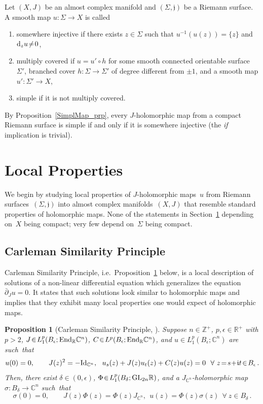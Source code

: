 \documentclass[11pt]{article}
\numberwithin{equation}{section}
\newtheorem{prp}[thm]{Proposition}
\theoremstyle{definition}
\def\BE#1{\begin{equation}\label{#1}}
\def\EE{\end{equation}}
\def\sf#1{\textsf{#1}}
\def\lra{\longrightarrow}
\def\C{\mathbb{C}}
\def\fI{\mathfrak i}
\def\fj{\mathfrak j}
\def\R{\mathbb R}
\def\Z{{\mathbb Z}}
\def\de{\delta}
\def\ep{\epsilon}
\def\si{\sigma}
\def\Si{\Sigma}
\def\dbar{\bar\partial}
\def\bu{\bullet}
\def\End{\textnormal{End}}
\def\GL{\textnormal{GL}}
\def\Id{\textnormal{Id}}
\def\nd{\textnormal{d}}
\begin{document}
\noindent
Let $(X,J)$ be an almost complex manifold and $(\Si,\fj)$ be a Riemann surface.
A smooth map \hbox{$u\!:\Si\!\lra\!X$} is called
\begin{enumerate}[label=$\bu$,leftmargin=*]

\item \sf{somewhere injective} if there exists $z\!\in\!\Si$
such that $u^{-1}(u(z))\!=\!\{z\}$ and $\nd_zu\!\neq\!0$,

\item \sf{multiply covered} if $u\!=\!u'\!\circ\!h$ 
for some smooth connected orientable surface~$\Si'$,
branched cover \hbox{$h\!:\!\Si\!\lra\!\Si'$} of degree different from $\pm1$,
and a smooth map $u'\!:\Si'\!\lra\!X$,

\item \sf{simple} if it is not multiply covered. 

\end{enumerate}
By Proposition~\ref{SimplMap_prp}, every $J$-holomorphic map from a compact Riemann
surface is simple if and only if it is somewhere injective
(the {\it if} implication is trivial).





\section{Local Properties}
\label{LocProp_sec}

\noindent
We begin by studying local properties of $J$-holomorphic maps~$u$
from Riemann surfaces~$(\Si,\fj)$ into almost complex manifolds~$(X,J)$
that resemble standard properties of holomorphic maps.
None of the statements in Section~\ref{LocProp_sec} depending on~$X$ being compact;
very few depend on~$\Si$ being compact.

\subsection{Carleman Similarity Principle}
\label{LocJMaps_subs}

\noindent
\sf{Carleman Similarity Principle}, i.e.~Proposition~\ref{FHS_prp} below, is a local description of 
solutions of a non-linear differential equation which generalizes the equation $\dbar_Ju\!=\!0$.
It states that such solutions look similar to holomorphic maps and implies
that they exhibit many local properties one would expect of holomorphic maps.

\begin{prp}[Carleman Similarity Principle, {{\cite[Theorem~2.2]{FHS}}}]\label{FHS_prp}
Suppose $n\!\in\!\Z^+$, \hbox{$p,\ep\!\in\!\R^+$} with $p\!>\!2$, 
$J\!\in\!L^p_1(B_{\ep};\End_{\R}\C^n)$, $C\!\in\!L^p(B_{\ep};\End_{\R}\C^n)$,
and $u\!\in\!L^p_1(B_{\ep};\C^n)$ are such~that 
\BE{FHScond_e} u(0)=0, \qquad
J(z)^2=-\Id_{\C^n}, ~~
u_s(z)+J(z)u_t(z)+C(z)u(z)=0 ~~\forall~z\!=\!s\!+\!\fI t\!\in\!B_{\ep}\,.\EE
Then, there exist $\de\!\in\!(0,\ep)$, 
$\Phi\!\in\!L_1^p(B_{\de};\GL_{2n}\R)$, and 
a $J_{\C^n}$-holomorphic map $\si\!:B_{\de}\!\lra\!\C^n$ such~that 
\BE{FHSconc_e} \si(0)=0, \qquad
J(z)\Phi(z)=\Phi(z)J_{\C^n},~~u(z)=\Phi(z)\si(z)
~~\forall~z\!\in\!B_{\de}\,.\EE
\end{prp}
\end{document}
